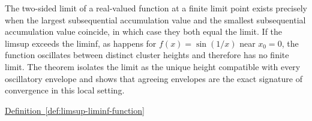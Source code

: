 \begin{remark*}[Interpretation]
The two-sided limit of a real-valued function at a finite limit point exists precisely when the largest subsequential accumulation value and the smallest subsequential accumulation value coincide, in which case they both equal the limit. If the limsup exceeds the liminf, as happens for $f(x) = \sin(1/x)$ near $x_0 = 0$, the function oscillates between distinct cluster heights and therefore has no finite limit. The theorem isolates the limit as the unique height compatible with every oscillatory envelope and shows that agreeing envelopes are the exact signature of convergence in this local setting.
\end{remark*}

\begin{remark*}[Dependencies]
\hyperref[def:limsup-liminf-function]{Definition~\ref*{def:limsup-liminf-function}}
\end{remark*}
